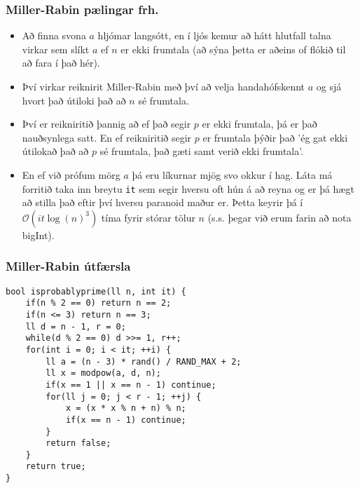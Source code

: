 \documentclass{beamer}
\begin{document}
\begin{frame}
\frametitle{Miller-Rabin pælingar frh.}

\begin{itemize}

\item<1-> Að finna svona $a$ hljómar langsótt, en í ljós kemur að hátt hlutfall talna virkar sem slíkt $a$ ef $n$ er ekki frumtala (að sýna þetta er aðeins of flókið til að fara í það hér).

\item<2-> Því virkar reiknirit Miller-Rabin með því að velja handahófskennt $a$ og sjá hvort það útiloki það að $n$ sé frumtala.

\item<3-> Því er reikniritið þannig að ef það segir $p$ er ekki frumtala, þá er það nauðsynlega satt. En ef reikniritið segir $p$ er frumtala þýðir það 'ég gat ekki útilokað það að $p$ sé frumtala, það gæti samt verið ekki frumtala'.

\item<4-> En ef við prófum mörg $a$ þá eru líkurnar mjög svo okkur í hag. Láta má forritið taka inn breytu \texttt{it} sem segir hversu oft hún á að reyna og er þá hægt að stilla það eftir því hversu paranoid maður er. Þetta keyrir þá í $\mathcal{O}(it\log(n)^3)$ tíma fyrir stórar tölur $n$ (s.s. þegar við erum farin að nota bigInt).

\end{itemize}

\end{frame}

\begin{frame}[fragile]
\frametitle{Miller-Rabin útfærsla}

\begin{small}
\begin{verbatim}
bool isprobablyprime(ll n, int it) {
    if(n % 2 == 0) return n == 2;
    if(n <= 3) return n == 3;
    ll d = n - 1, r = 0;
    while(d % 2 == 0) d >>= 1, r++;
    for(int i = 0; i < it; ++i) {
        ll a = (n - 3) * rand() / RAND_MAX + 2;
        ll x = modpow(a, d, n);
        if(x == 1 || x == n - 1) continue;
        for(ll j = 0; j < r - 1; ++j) {
            x = (x * x % n + n) % n;
            if(x == n - 1) continue;
        }
        return false;
    }
    return true;
}
\end{verbatim}
\end{small}

\end{frame}
\end{document}

